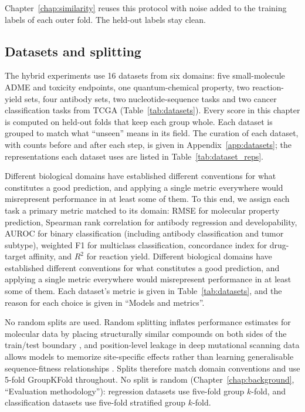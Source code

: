 Chapter~\ref{chap:similarity} reuses this protocol with noise added to the training labels of each outer fold. The held-out labels stay clean.


\subsection{Datasets and splitting}

The hybrid experiments use 16 datasets from six domains: five small-molecule ADME and toxicity endpoints, one quantum-chemical property, two reaction-yield sets, four antibody sets, two nucleotide-sequence tasks and two cancer classification tasks from TCGA (Table~\ref{tab:datasets}). Every score in this chapter is computed on held-out folds that keep each group whole. Each dataset is grouped to match what ``unseen'' means in its field. The curation of each dataset, with counts before and after each step, is given in Appendix~\ref{app:datasets}; the representations each dataset uses are listed in Table~\ref{tab:dataset_reps}.

Different biological domains have established different conventions for what constitutes a good prediction, and applying a single metric everywhere would misrepresent performance in at least some of them. To this end, we assign each task a primary metric matched to its domain: RMSE for molecular property prediction, Spearman rank correlation for antibody regression and developability, AUROC for binary classification (including antibody classification and tumor subtype), weighted F1 for multiclass classification, concordance index for drug-target affinity, and $R^2$ for reaction yield.
Different biological domains have established different conventions for what constitutes a good prediction, and applying a single metric everywhere would misrepresent performance in at least some of them. Each dataset's metric is given in Table~\ref{tab:datasets}, and the reason for each choice is given in ``Models and metrics''.

No random splits are used. Random splitting inflates performance estimates for molecular data by placing structurally similar compounds on both sides of the train/test boundary \citep{Yang2019, Wallach2018}, and position-level leakage in deep mutational scanning data allows models to memorize site-specific effects rather than learning generalisable sequence-fitness relationships \citep{Notin2023, Vieira2026}. Splits therefore match domain conventions and use 5-fold GroupKFold throughout.
No split is random (Chapter~\ref{chap:background}, ``Evaluation methodology''): regression datasets use five-fold group $k$-fold, and classification datasets use five-fold stratified group $k$-fold.

